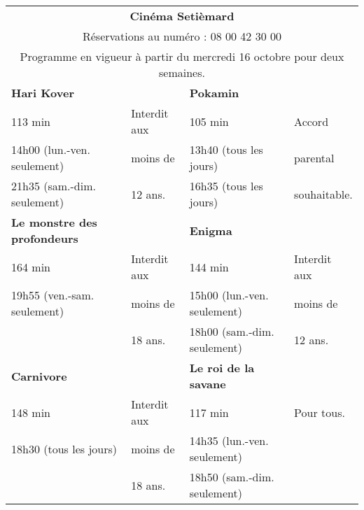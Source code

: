 \begin{center}
   {\small
   \begin{tabular}{|p{4cm}p{1.8cm}|p{4cm}p{1.8cm}|}
      \hline
      \multicolumn{4}{|c|}{\bf Cinéma Setièmard} \\
      \multicolumn{4}{|c|}{Réservations au numéro : 08 00 42 30 00} \\
      \multicolumn{4}{|c|}{Programme en vigueur à partir du mercredi 16 octobre pour deux semaines.} \\
      \hline
      \bf Hari Kover & & \bf Pokamin & \\
      113 min & Interdit aux & 105 min & Accord \\
      14h00 (lun.-ven. seulement) & moins de & 13h40 (tous les jours) & parental \\
      21h35 (sam.-dim. seulement) & 12 ans. & 16h35 (tous les jours) & souhaitable. \\
      \hline
      \bf Le monstre des profondeurs & & \bf Enigma & \\
      164 min & Interdit aux & 144 min & Interdit aux \\
      19h55 (ven.-sam. seulement) & moins de & 15h00 (lun.-ven. seulement) & moins de \\
      & 18 ans. & 18h00 (sam.-dim. seulement) & 12 ans. \\
      \hline
      \bf Carnivore & & \bf Le roi de la savane & \\
      148 min & Interdit aux & 117 min & Pour tous. \\
      18h30 (tous les jours) & moins de & 14h35 (lun.-ven. seulement) & \\
      & 18 ans. & 18h50 (sam.-dim. seulement) & \\
      \hline
   \end{tabular}}
\end{center}

